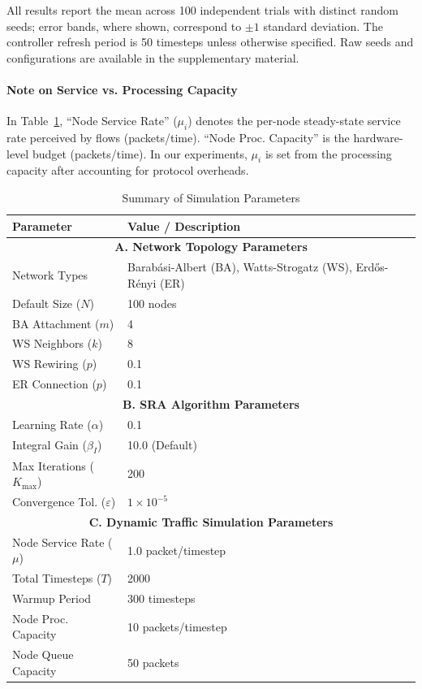 \documentclass[journal]{IEEEtran}
\begin{document}
All results report the mean across 100 independent trials with distinct random seeds; error bands, where shown, correspond to $\pm1$ standard deviation. The controller refresh period is 50 timesteps unless otherwise specified. Raw seeds and configurations are available in the supplementary material.

\paragraph*{Note on Service vs. Processing Capacity} 
In Table~\ref{tab:sim_params}, ``Node Service Rate'' ($\mu_i$) denotes the per-node steady-state service rate perceived by flows (packets/time). ``Node Proc. Capacity'' is the hardware-level budget (packets/time). In our experiments, $\mu_i$ is set from the processing capacity after accounting for protocol overheads.

\begin{table}[t!]
\centering
\caption{Summary of Simulation Parameters}
\label{tab:sim_params}
\renewcommand{\arraystretch}{1.2}
\small
\begin{tabularx}{\columnwidth}{|l|X|}
\hline
\textbf{Parameter} & \textbf{Value / Description} \\
\hline
\hline
\multicolumn{2}{|c|}{\textbf{A. Network Topology Parameters}} \\
\hline
Network Types & Barabási-Albert (BA), Watts-Strogatz (WS), Erd\H{o}s-Rényi (ER) \\
\hline
Default Size ($N$) & 100 nodes \\
\hline
BA Attachment ($m$) & 4 \\
\hline
WS Neighbors ($k$) & 8 \\
\hline
WS Rewiring ($p$) & 0.1 \\
\hline
ER Connection ($p$) & 0.1 \\
\hline
\hline
\multicolumn{2}{|c|}{\textbf{B. SRA Algorithm Parameters}} \\
\hline
Learning Rate ($\alpha$) & 0.1 \\
\hline
Integral Gain ($\beta_I$) & 10.0 (Default) \\
\hline
Max Iterations ($K_{\max}$) & 200 \\
\hline
Convergence Tol. ($\varepsilon$) & $1 \times 10^{-5}$ \\
\hline
\hline
\multicolumn{2}{|c|}{\textbf{C. Dynamic Traffic Simulation Parameters}} \\
\hline
Node Service Rate ($\mu$) & 1.0 packet/timestep \\
\hline
Total Timesteps ($T$) & 2000 \\
\hline
Warmup Period & 300 timesteps \\
\hline
Node Proc. Capacity & 10 packets/timestep \\
\hline
Node Queue Capacity & 50 packets \\
\hline
\end{tabularx}
\end{table}
\end{document}
